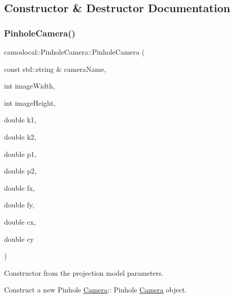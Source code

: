 \subsection{Constructor \& Destructor Documentation}
\mbox{\label{classcamodocal_1_1PinholeCamera_a0c9a5b62bd0e40adfa76585ab1fa3e9e}} 
\subsubsection{\texorpdfstring{Pinhole\+Camera()}{PinholeCamera()}\hspace{0.1cm}{\footnotesize\ttfamily [1/2]}}
{\footnotesize\ttfamily camodocal\+::\+Pinhole\+Camera\+::\+Pinhole\+Camera (\begin{DoxyParamCaption}\item[{const std\+::string \&}]{camera\+Name,  }\item[{int}]{image\+Width,  }\item[{int}]{image\+Height,  }\item[{double}]{k1,  }\item[{double}]{k2,  }\item[{double}]{p1,  }\item[{double}]{p2,  }\item[{double}]{fx,  }\item[{double}]{fy,  }\item[{double}]{cx,  }\item[{double}]{cy }\end{DoxyParamCaption})}



Constructor from the projection model parameters. 

Construct a new Pinhole \hyperlink{classcamodocal_1_1Camera}{Camera}\+:\+: Pinhole \hyperlink{classcamodocal_1_1Camera}{Camera} object.


